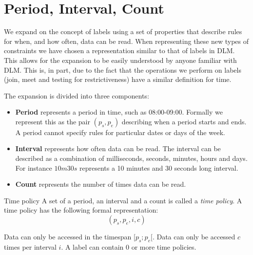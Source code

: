 
\section{\textbf{P}eriod, \textbf{I}nterval, \textbf{C}ount}\label{time:pic}
We expand on the concept of labels using a set of properties that describe rules for when, and how often, data can be read.
When representing these new types of constraints we have chosen a representation similar to that of labels in DLM.
This allows for the expansion to be easily understood by anyone familiar with DLM.
This is, in part, due to the fact that the operations we perform on labels (join, meet and testing for restrictiveness) have a similar definition for time.

The expansion is divided into three components:
\begin{itemize}
  \item \textbf{Period} represents a period in time, such as 08:00-09:00.
  Formally we represent this as the pair $(p_s, p_e)$ describing when a period starts and ends.
  A period cannot specify rules for particular dates or days of the week.

  \item \textbf{Interval} represents how often data can be read.
  The interval can be described as a combination of milliseconds, seconds, minutes, hours and days.
  For instance $10m30s$ represents a 10 minutes and 30 seconds long interval.

  \item \textbf{Count} represents the number of times data can be read.
\end{itemize}

\begin{definition}{Time policy}
  A set of a period, an interval and a count is called a \textit{time policy}.
  A time policy has the following formal representation: $$(p_s, p_e, i, c)$$

  Data can only be accessed in the timespan $[p_s; p_e[$.
  Data can only be accessed $c$ times per interval $i$.
  A label can contain 0 or more time policies.
\end{definition}

